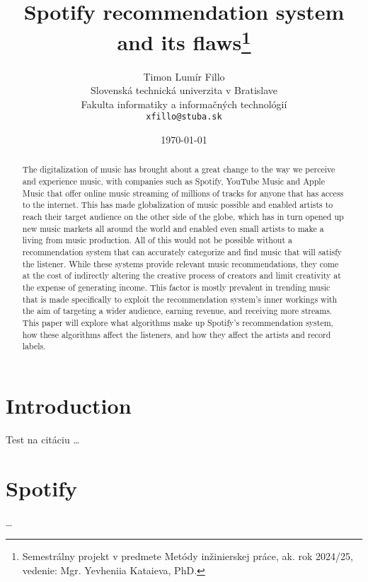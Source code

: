 \documentclass[10pt,twoside,slovak,a4paper]{article}
\title{Spotify recommendation system and its flaws\thanks{Semestrálny projekt v predmete Metódy inžinierskej práce, ak. rok 2024/25, vedenie: Mgr. Yevheniia Kataieva, PhD.}} %
\author{Timon Lumír Fillo\\[2pt]
	{\small Slovenská technická univerzita v Bratislave}\\
	{\small Fakulta informatiky a informačných technológií}\\
	{\small \texttt{xfillo@stuba.sk}}
	}
\date{\small \today} %
\begin{document}
\maketitle

\begin{abstract}

The digitalization of music has brought about a great change to the way we perceive and experience music, with companies such as Spotify, YouTube Music and Apple Music that offer online music streaming of millions of tracks for anyone that has access to the internet. This has made globalization of music possible and enabled artists to reach their target audience on the other side of the globe, which has in turn opened up new music markets all around the world and enabled even small artists to make a living from music production. All of this would not be possible without a recommendation system that can accurately categorize and find music that will satisfy the listener. While these systems provide relevant music recommendations, they come at the cost of indirectly altering the creative process of creators and limit creativity at the expense of generating income. This factor is mostly prevalent in trending music that is made specifically to exploit the recommendation system's inner workings with the aim of targeting a wider audience, earning revenue, and receiving more streams. This paper will explore what algorithms make up Spotify's recommendation system, how these algorithms affect the listeners, and how they affect the artists and record labels.

\end{abstract}



\section{Introduction}
Test na citáciu
\cite{hodgson2021spotify}
\dots


\section{Spotify}\label{spotify}
\dots
\end{document}
